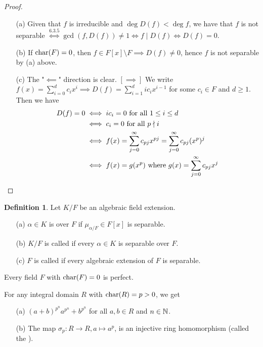 \documentclass[11pt]{book}
\theoremstyle{definition}   \newtheorem{defn}[counter]{Definition} %
\newcommand{\bs}{\setminus}   \newcommand{\A}{\mathcal{A}}   \newcommand{\sy}{\textnormal{Syl}}   \newcommand{\size}[1]{\left| #1 \right|}
\DeclareMathOperator{\ra}{\rightarrow}   \DeclareMathOperator{\Poly}{\mathbf{P}}   \DeclareMathOperator{\spn}{\textnormal{span}}   \DeclareMathOperator{\aut}{\textnormal{Aut}}
\newcommand{\vs}{\vspace{8pt}}
\numberwithin{counter}{chapter}
\begin{document}
\begin{proof}\ 
\begin{enumerate}
\item[(a)] Given that $f$ is irreducible and $\deg D(f) < \deg f$, we have that $f$ is not separable $\overset{6.3.5}{\iff} \gcd(f,D(f)) \ne 1 \iff f \mid D(f) \iff D(f) = 0$. 
\item[(b)] If $\textnormal{char}(F) = 0$, then $f \in F[x] \bs F \implies D(f) \ne 0$, hence $f$ is not separable by (a) above. 
\item[(c)] The "$\impliedby$" direction is clear. $[\implies]$ We write $f(x) = \sum_{i=0}^d c_i x^i \implies D(f) = \sum_{i=1}^d i c_i x^{i-1}$ for some $c_i \in F$ and $d \geq 1$. Then we have 
\begin{align*}
D(f) = 0 & \iff ic_i = 0 \textnormal{ for all } 1 \leq i \leq d \\
&\iff c_i = 0 \textnormal{ for all } p \nmid i \\
&\iff f(x) = \sum_{j=0}^\infty c_{pj} x^{pj} = \sum_{j=0}^\infty c_{pj} (x^p)^j \\
&\iff f(x) = g(x^p) \textnormal{ where } g(x) = \sum_{j=0}^\infty c_{pj} x^j
\end{align*}
\end{enumerate}
\end{proof}


\begin{defn}
Let $K/F$ be an algebraic field extension. 
\begin{enumerate}
\item[(a)] $\alpha \in K$ is  over $F$ if $\mu_{\alpha/F} \in F[x]$ is separable. 
\item[(b)] $K/F$ is called \tb{separable} if every $\alpha \in K$ is separable over $F$. 
\item[(c)] $F$ is called \tb{perfect} if every algebraic extension of $F$ is separable. 
\end{enumerate}
\end{defn}

\vs

\begin{corollary}
Every field $F$ with $\textnormal{char}(F) = 0$ is perfect. 
\end{corollary}

\vs

\begin{lemma}[+ Definition]
For any integral domain $R$ with $\textnormal{char}(R) = p > 0$, we get
\begin{enumerate}
\item[(a)] $(a+b)^{p^n}  a^{p^n} + b^{p^n}$ for all $a,b \in R$ and $n \in \operatorname{\mathbb{N}}$. 
\item[(b)] The map $\sigma_p : R \ra R, a \mapsto a^p$, is an injective ring homomorphism (called the ). 
\end{enumerate}
\end{lemma}
\end{document}
